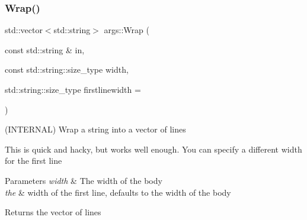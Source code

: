 \mbox{\label{namespaceargs_aea5e48b66d8f87aaa5aafd1243f616f4}} 
\subsubsection{\texorpdfstring{Wrap()}{Wrap()}}
{\footnotesize\ttfamily std\+::vector$<$std\+::string$>$ args\+::\+Wrap (\begin{DoxyParamCaption}\item[{const std\+::string \&}]{in,  }\item[{const std\+::string\+::size\+\_\+type}]{width,  }\item[{std\+::string\+::size\+\_\+type}]{firstlinewidth = {} }\end{DoxyParamCaption})\hspace{0.3cm}{\ttfamily [inline]}}

(I\+N\+T\+E\+R\+N\+AL) Wrap a string into a vector of lines

This is quick and hacky, but works well enough. You can specify a different width for the first line


\begin{DoxyParams}{Parameters}
{\em width} & The width of the body \\
\hline
{\em the} & width of the first line, defaults to the width of the body \\
\hline
\end{DoxyParams}
\begin{DoxyReturn}{Returns}
the vector of lines 
\end{DoxyReturn}
